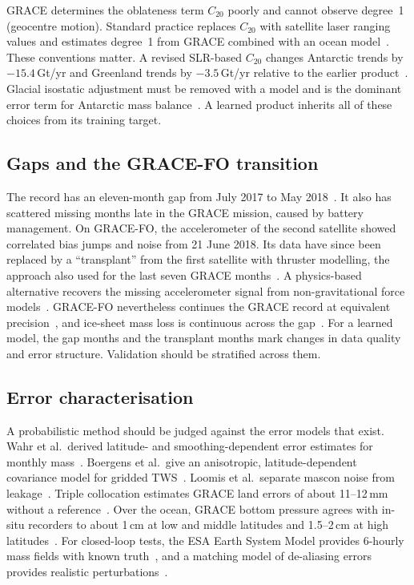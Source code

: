GRACE determines the oblateness term $C_{20}$ poorly and cannot observe degree~1 (geocentre motion). Standard practice replaces $C_{20}$ with satellite laser ranging values and estimates degree~1 from GRACE combined with an ocean model~\cite{swenson2008geocenter,chen2022applications}. These conventions matter. A revised SLR-based $C_{20}$ changes Antarctic trends by $-15.4$\,Gt/yr and Greenland trends by $-3.5$\,Gt/yr relative to the earlier product~\cite{loomis2019oblateness}. Glacial isostatic adjustment must be removed with a model and is the dominant error term for Antarctic mass balance~\cite{chen2022applications}. A learned product inherits all of these choices from its training target.

\subsection{Gaps and the GRACE-FO transition}

The record has an eleven-month gap from July 2017 to May 2018~\cite{chen2022applications}. It also has scattered missing months late in the GRACE mission, caused by battery management. On GRACE-FO, the accelerometer of the second satellite showed correlated bias jumps and noise from 21 June 2018. Its data have since been replaced by a ``transplant'' from the first satellite with thruster modelling, the approach also used for the last seven GRACE months~\cite{landerer2020extending}. A physics-based alternative recovers the missing accelerometer signal from non-gravitational force models~\cite{behzadpour2021acc_recovery}. GRACE-FO nevertheless continues the GRACE record at equivalent precision~\cite{landerer2020extending}, and ice-sheet mass loss is continuous across the gap~\cite{velicogna2020continuity}. For a learned model, the gap months and the transplant months mark changes in data quality and error structure. Validation should be stratified across them.

\subsection{Error characterisation}

A probabilistic method should be judged against the error models that exist. Wahr et al.\ derived latitude- and smoothing-dependent error estimates for monthly mass~\cite{wahr2006accuracy}. Boergens et al.\ give an anisotropic, latitude-dependent covariance model for gridded TWS~\cite{boergens2020covariance}. Loomis et al.\ separate mascon noise from leakage~\cite{loomis2019regularization}. Triple collocation estimates GRACE land errors of about 11--12\,mm without a reference~\cite{vandijk2014reanalysis}. Over the ocean, GRACE bottom pressure agrees with in-situ recorders to about 1\,cm at low and middle latitudes and 1.5--2\,cm at high latitudes~\cite{chambers2012obp}. For closed-loop tests, the ESA Earth System Model provides 6-hourly mass fields with known truth~\cite{dobslaw2015esa_esm}, and a matching model of de-aliasing errors provides realistic perturbations~\cite{dobslaw2016dealiasing_errors}.

